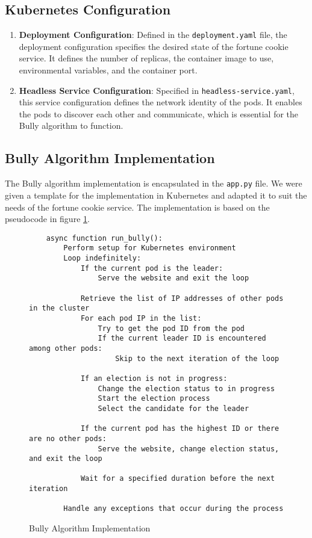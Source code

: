 \documentclass{article}
\begin{document}
  \subsection{Kubernetes Configuration}
    \begin{enumerate}
      \item \textbf{Deployment Configuration}: Defined in the \texttt{deployment.yaml} file, the deployment configuration specifies the desired state of the fortune cookie service. It defines the number of replicas, the container image to use, environmental variables, and the container port.
      \item \textbf{Headless Service Configuration}: Specified in \texttt{headless-service.yaml}, this service configuration defines the network identity of the pods. It enables the pods to discover each other and communicate, which is essential for the Bully algorithm to function.
    \end{enumerate}

  \subsection{Bully Algorithm Implementation}
  The Bully algorithm implementation is encapsulated in the \texttt{app.py} file. We were given a template for the implementation in Kubernetes\cite{bullyInKubernetes} and adapted it to suit the needs of the fortune cookie service. The implementation is based on the pseudocode in figure \ref{fig:bully-algorithm-implementation}.
  \begin{figure}[h!]
    \centering
  \begin{verbatim}
    async function run_bully():
        Perform setup for Kubernetes environment
        Loop indefinitely:
            If the current pod is the leader:
                Serve the website and exit the loop
    
            Retrieve the list of IP addresses of other pods in the cluster
            For each pod IP in the list:
                Try to get the pod ID from the pod
                If the current leader ID is encountered among other pods:
                    Skip to the next iteration of the loop
    
            If an election is not in progress:
                Change the election status to in progress
                Start the election process
                Select the candidate for the leader
    
            If the current pod has the highest ID or there are no other pods:
                Serve the website, change election status, and exit the loop
    
            Wait for a specified duration before the next iteration
    
        Handle any exceptions that occur during the process
    \end{verbatim}
    \caption{Bully Algorithm Implementation}
    \label{fig:bully-algorithm-implementation}
  \end{figure}
\end{document}
